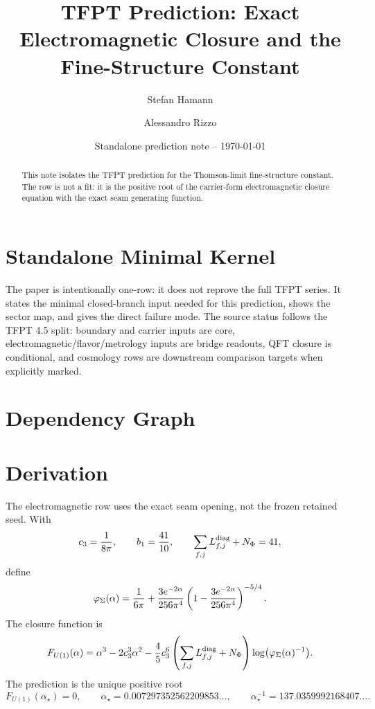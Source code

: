 \documentclass[11pt,a4paper]{article}
\title{\color{tfptblue}\textbf{TFPT Prediction: Exact Electromagnetic Closure and the Fine-Structure Constant}}
\author{Stefan Hamann \and Alessandro Rizzo}
\date{{\normalsize\color{tfptgray}\sffamily Standalone prediction note -- \today}}
\begin{document}
\maketitle

\begin{abstract}
This note isolates the TFPT prediction for the Thomson-limit fine-structure constant. The row is not a fit: it is the positive root of the carrier-form electromagnetic closure equation with the exact seam generating function.
\end{abstract}



\section{Standalone Minimal Kernel}
\MinimalKernelBox

The paper is intentionally one-row: it does not reprove the full TFPT series. It states the minimal closed-branch input needed for this prediction, shows the sector map, and gives the direct failure mode. The source status follows the TFPT 4.5 split: boundary and carrier inputs are core, electromagnetic/flavor/metrology inputs are bridge readouts, QFT closure is conditional, and cosmology rows are downstream comparison targets when explicitly marked.


\section{Dependency Graph}

\section{Derivation}

The electromagnetic row uses the exact seam opening, not the frozen retained seed. With
\[
c_3=\frac{1}{8\pi},\qquad b_1=\frac{41}{10},\qquad
\sum_{f,j}L_{f,j}^{\mathrm{diag}}+N_\Phi=41,
\]
define
\[
\varphi_{\Sigma}(\alpha)=\frac{1}{6\pi}+\frac{3e^{-2\alpha}}{256\pi^4}
\left(1-\frac{3e^{-2\alpha}}{256\pi^4}\right)^{-5/4}.
\]
The closure function is
\[
F_{U(1)}(\alpha)=\alpha^3-2c_3^3\alpha^2-
\frac45c_3^6\left(\sum_{f,j}L_{f,j}^{\mathrm{diag}}+N_\Phi\right)
\log\bigl(\varphi_{\Sigma}(\alpha)^{-1}\bigr).
\]
The prediction is the unique positive root
\[
F_{U(1)}(\alpha_\star)=0,
\qquad
\alpha_\star=0.007297352562209853\ldots,
\qquad
\alpha_\star^{-1}=137.0359992168407\ldots .
\]
\end{document}
